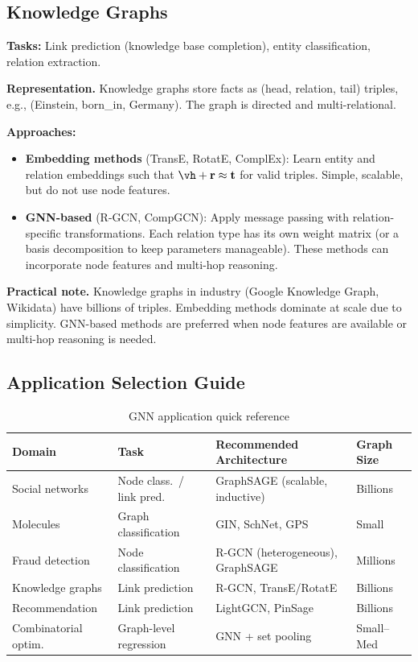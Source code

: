 \subsection{Knowledge Graphs}

\textbf{Tasks:} Link prediction (knowledge base completion), entity classification, relation extraction.

\textbf{Representation.} Knowledge graphs store facts as (head, relation, tail) triples, e.g., (Einstein, born\_in, Germany). The graph is directed and multi-relational.

\textbf{Approaches:}
\begin{itemize}
    \item \textbf{Embedding methods} (TransE, RotatE, ComplEx): Learn entity and relation embeddings such that $\vh + \mathbf{r} \approx \mathbf{t}$ for valid triples. Simple, scalable, but do not use node features.
    \item \textbf{GNN-based} (R-GCN, CompGCN): Apply message passing with relation-specific transformations. Each relation type has its own weight matrix (or a basis decomposition to keep parameters manageable). These methods can incorporate node features and multi-hop reasoning.
\end{itemize}

\textbf{Practical note.} Knowledge graphs in industry (Google Knowledge Graph, Wikidata) have billions of triples. Embedding methods dominate at scale due to simplicity. GNN-based methods are preferred when node features are available or multi-hop reasoning is needed.

\subsection{Application Selection Guide}

\begin{table}[H]
\centering
\caption{GNN application quick reference}
\begin{tabularx}{\textwidth}{lXXl}
\toprule
\textbf{Domain} & \textbf{Task} & \textbf{Recommended Architecture} & \textbf{Graph Size} \\
\midrule
Social networks & Node class.\ / link pred. & GraphSAGE (scalable, inductive) & Billions \\
Molecules & Graph classification & GIN, SchNet, GPS & Small \\
Fraud detection & Node classification & R-GCN (heterogeneous), GraphSAGE & Millions \\
Knowledge graphs & Link prediction & R-GCN, TransE/RotatE & Billions \\
Recommendation & Link prediction & LightGCN, PinSage & Billions \\
Combinatorial optim. & Graph-level regression & GNN + set pooling & Small--Med \\
\bottomrule
\end{tabularx}
\end{table}

